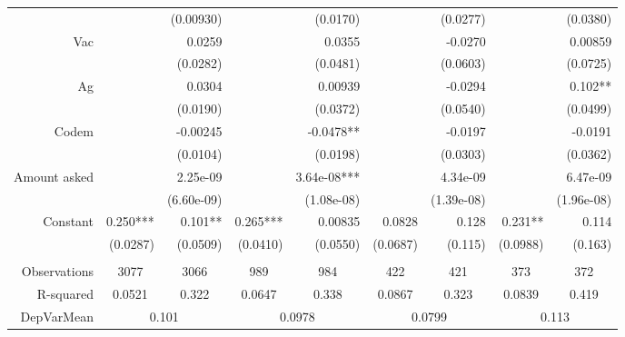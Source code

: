 \begin{tabular}{rrrrrrrrr}
      &       & (0.00930) &       & (0.0170) &       & (0.0277) &       & (0.0380) \\
Vac   &       & 0.0259 &       & 0.0355 &       & -0.0270 &       & 0.00859 \\
      &       & (0.0282) &       & (0.0481) &       & (0.0603) &       & (0.0725) \\
Ag    &       & 0.0304 &       & 0.00939 &       & -0.0294 &       & 0.102** \\
      &       & (0.0190) &       & (0.0372) &       & (0.0540) &       & (0.0499) \\
Codem &       & -0.00245 &       & -0.0478** &       & -0.0197 &       & -0.0191 \\
      &       & (0.0104) &       & (0.0198) &       & (0.0303) &       & (0.0362) \\
Amount asked &       & 2.25e-09 &       & 3.64e-08*** &       & 4.34e-09 &       & 6.47e-09 \\
      &       & (6.60e-09) &       & (1.08e-08) &       & (1.39e-08) &       & (1.96e-08) \\
Constant & 0.250*** & 0.101** & 0.265*** & 0.00835 & 0.0828 & 0.128 & 0.231** & 0.114 \\
      & (0.0287) & (0.0509) & (0.0410) & (0.0550) & (0.0687) & (0.115) & (0.0988) & (0.163) \\
      &       &       &       &       &       &       &       &  \\
Observations & \multicolumn{1}{c}{3077} & \multicolumn{1}{c}{3066} & \multicolumn{1}{c}{989} & \multicolumn{1}{c}{984} & \multicolumn{1}{c}{422} & \multicolumn{1}{c}{421} & \multicolumn{1}{c}{373} & \multicolumn{1}{c}{372} \\
R-squared & \multicolumn{1}{c}{0.0521} & \multicolumn{1}{c}{0.322} & \multicolumn{1}{c}{0.0647} & \multicolumn{1}{c}{0.338} & \multicolumn{1}{c}{0.0867} & \multicolumn{1}{c}{0.323} & \multicolumn{1}{c}{0.0839} & \multicolumn{1}{c}{0.419} \\
DepVarMean & \multicolumn{2}{c}{0.101} & \multicolumn{2}{c}{0.0978} & \multicolumn{2}{c}{0.0799} & \multicolumn{2}{c}{0.113} \\
\bottomrule
\end{tabular}%
